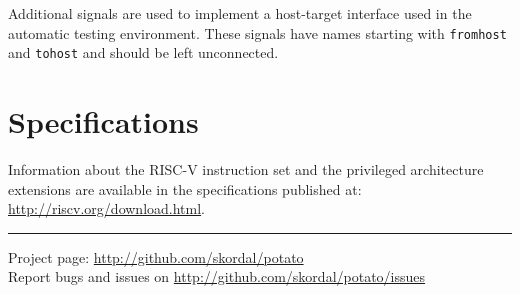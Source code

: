 \documentclass[10pt,a4paper]{article}
\begin{document}
\begin{minipage}[t]{0.48\textwidth}
Additional signals are used to implement a host-target interface used in the automatic testing
environment. These signals have names starting with \texttt{fromhost} and \texttt{tohost} and
should be left unconnected.\\

\section{Specifications}

Information about the RISC-V instruction set and the privileged architecture extensions are
available in the specifications published at:\\

\url{http://riscv.org/download.html}.

\end{minipage}

\vfill
\noindent\rule{\linewidth}{1pt}
{\small
Project page: \url{http://github.com/skordal/potato}\\
Report bugs and issues on \url{http://github.com/skordal/potato/issues}}
\end{document}
